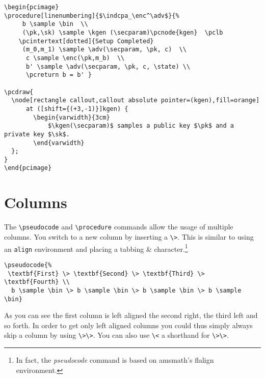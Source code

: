 \documentclass[a4paper]{report}
\begin{document}
\begin{lstlisting}
\begin{pcimage}
\procedure[linenumbering]{$\indcpa_\enc^\adv$}{%
	 b \sample \bin  \\
	 (\pk,\sk) \sample \kgen (\secparam)\pcnode{kgen}  \pclb
	\pcintertext[dotted]{Setup Completed}
	 (m_0,m_1) \sample \adv(\secparam, \pk, c)  \\
	  c \sample \enc(\pk,m_b)  \\
	  b' \sample \adv(\secparam, \pk, c, \state) \\
	  \pcreturn b = b' }

\pcdraw{
  \node[rectangle callout,callout absolute pointer=(kgen),fill=orange]
      at ([shift={(+3,-1)}]kgen) {
		\begin{varwidth}{3cm}
			$\kgen(\secparam)$ samples a public key $\pk$ and a private key $\sk$.
		\end{varwidth}
  };
}
\end{pcimage}
\end{lstlisting}



\section{Columns}
The \lstinline$\pseudocode$ and \lstinline$\procedure$ commands allow the usage of multiple columns.
You switch to a new column by inserting a \lstinline$\>$. This is similar to using an \lstinline$align$
environment and placing a tabbing \& character.\footnote{In fact, the \emph{pseudocode} command
is based on amsmath's flalign environment.}
\begin{center}
\end{center}
\begin{lstlisting}
\pseudocode{%
 \textbf{First} \> \textbf{Second} \> \textbf{Third} \> \textbf{Fourth} \\
  b \sample \bin \> b \sample \bin \> b \sample \bin \> b \sample \bin}
\end{lstlisting}
As you can see the first column is left aligned the second right, the third left and so forth.
In order to get only left aligned columns you could thus simply always skip a column by
using \lstinline$\>\>$. You can also use \lstinline$\<$ a shorthand for \lstinline$\>\>$.
\begin{center}
\end{center}
\end{document}
